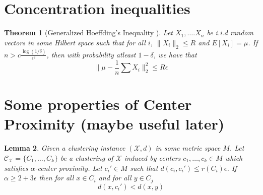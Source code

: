 \documentclass[11pt]{article}
\newtheorem{theorem}{Theorem}
\newtheorem{lemma}[theorem]{Lemma}
\newcommand{\mc}{\mathcal}
\begin{document}
\appendix
\section{Concentration inequalities}
\label{appendixsection:conIneq}

\begin{theorem}[Generalized Hoeffding's Inequality \cite{ashtiani2015dimension}]
\label{thm:genHoeff}
Let $X_1, \ldots. X_n$ be i.i.d random vectors in some Hilbert space such that for all $i$, $\|X_i\|_2 \le R$ and $E[X_i] = \mu$. If $n > c\frac{\log(1/\delta)}{\epsilon^2}$, then with probability atleast $1-\delta$, we have that
$$\Big\|\mu - \frac{1}{n}\sum X_i\Big\|_2^2 \le R\epsilon$$ 
\end{theorem}

\section{Some properties of Center Proximity (maybe useful later)}
\begin{lemma}
\label{lemma:hasPropertyR}
Given a clustering instance $(\mc X, d)$ in some metric space $M$. Let $\mc C_{\mc X} = \{C_1, \ldots, C_k\}$ be a clustering of $\mc X$ induced by centers $c_1, \ldots, c_k \in M$ which satisfies $\alpha$-center proximity. Let $c_i' \in M$ such that $d(c_i, c_i') \le r(C_i)\epsilon$. If $\alpha \ge 2 + 3\epsilon$ then for all $x \in C_i$ and for all $y \in C_j$
$$d(x, c_i') < d(x, y)$$  
\end{lemma}
\end{document}
